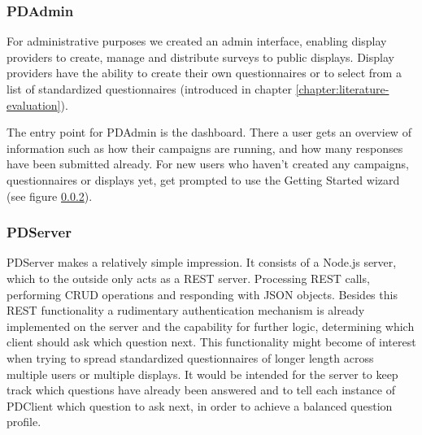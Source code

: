 	\subsubsection{PDAdmin}

		For administrative purposes we created an admin interface, enabling display providers to create, manage and distribute surveys to public displays. 		Display providers have the ability to create their own questionnaires or to select from a list of standardized questionnaires (introduced in chapter \ref{chapter:literature-evaluation}).

		The entry point for PDAdmin is the dashboard. There a user gets an overview of information such as how their campaigns are running, and how many responses have been submitted already. 
		For new users who haven't created any campaigns, questionnaires or displays yet, get prompted to use the Getting Started wizard (see figure \ref{}).



			





	\subsubsection{PDServer}

		PDServer makes a relatively simple impression. It consists of a Node.js server, which to the outside only acts as a REST server. Processing REST calls, performing CRUD operations and responding with JSON objects. Besides this REST functionality a rudimentary authentication mechanism is already implemented on the server and the capability for further logic, determining which client should ask which question next. This functionality might become of interest when trying to spread standardized questionnaires of longer length across multiple users or multiple displays. It would be intended for the server to keep track which questions have already been answered and to tell each instance of PDClient which question to ask next, in order to achieve a balanced question profile.



